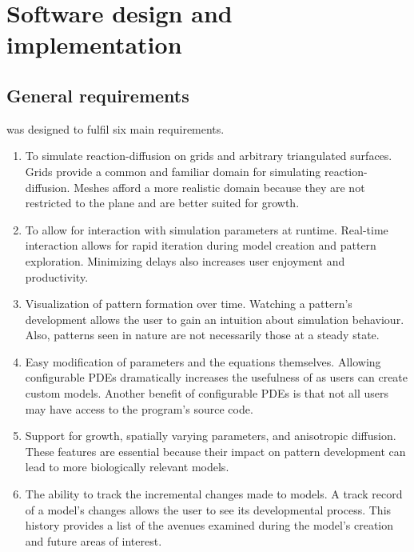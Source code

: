 \chapter{Software design and  implementation}

\section{General requirements}
\ProgramName{} was designed to fulfil six main requirements.

\begin{enumerate}
	\item To simulate reaction-diffusion on grids and arbitrary triangulated surfaces. Grids provide a common and familiar domain for simulating reaction-diffusion. Meshes afford a more realistic domain because they are not restricted to the plane and are better suited for growth. 
	
	\item To allow for interaction with simulation parameters at runtime. Real-time interaction allows for rapid iteration during model creation and pattern exploration. Minimizing delays also increases user enjoyment and productivity. %

	\item Visualization of pattern formation over time. Watching a pattern's development allows the user to gain an intuition about simulation behaviour. Also, patterns seen in nature are not necessarily those at a steady state.
	
	\item Easy modification of parameters and the equations themselves. Allowing configurable PDEs dramatically increases the usefulness of \ProgramName{} as users can create custom models. Another benefit of configurable PDEs is that not all users may have access to the program's source code. 
		
	\item Support for growth, spatially varying parameters, and anisotropic diffusion. These features are essential because their impact on pattern development can lead to more biologically relevant models. 
	
	\item The ability to track the incremental changes made to models. A track record of a model's changes allows the user to see its developmental process. This history provides a list of the avenues examined during the model's creation and future areas of interest.
\end{enumerate}

